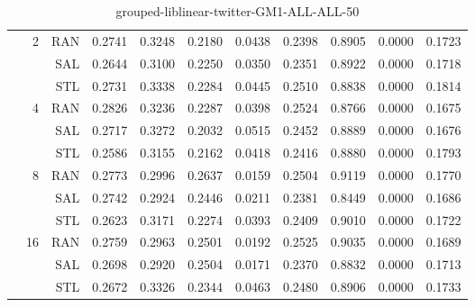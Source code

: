\begin{center}
\begin{table}[htbp]
\begin{tabular}{ | r | r | r | r | r | r | r | r | r | r | r |}
 & \multirow{3}{*}{2} & RAN & 0.2741 & 0.3248 & 0.2180 & 0.0438 & 0.2398 & 0.8905 & 0.0000 & 0.1723\\ \cline{3-11}
 &   & SAL & 0.2644 & 0.3100 & 0.2250 & 0.0350 & 0.2351 & 0.8922 & 0.0000 & 0.1718\\ \cline{3-11}
 &   & STL & 0.2731 & 0.3338 & 0.2284 & 0.0445 & 0.2510 & 0.8838 & 0.0000 & 0.1814\\ \cline{2-11}
 & \multirow{3}{*}{4} & RAN & 0.2826 & 0.3236 & 0.2287 & 0.0398 & 0.2524 & 0.8766 & 0.0000 & 0.1675\\ \cline{3-11}
 &   & SAL & 0.2717 & 0.3272 & 0.2032 & 0.0515 & 0.2452 & 0.8889 & 0.0000 & 0.1676\\ \cline{3-11}
 &   & STL & 0.2586 & 0.3155 & 0.2162 & 0.0418 & 0.2416 & 0.8880 & 0.0000 & 0.1793\\ \cline{2-11}
 & \multirow{3}{*}{8} & RAN & 0.2773 & 0.2996 & 0.2637 & 0.0159 & 0.2504 & 0.9119 & 0.0000 & 0.1770\\ \cline{3-11}
 &   & SAL & 0.2742 & 0.2924 & 0.2446 & 0.0211 & 0.2381 & 0.8449 & 0.0000 & 0.1686\\ \cline{3-11}
 &   & STL & 0.2623 & 0.3171 & 0.2274 & 0.0393 & 0.2409 & 0.9010 & 0.0000 & 0.1722\\ \cline{2-11}
 & \multirow{3}{*}{16} & RAN & 0.2759 & 0.2963 & 0.2501 & 0.0192 & 0.2525 & 0.9035 & 0.0000 & 0.1689\\ \cline{3-11}
 &   & SAL & 0.2698 & 0.2920 & 0.2504 & 0.0171 & 0.2370 & 0.8832 & 0.0000 & 0.1713\\ \cline{3-11}
 &   & STL & 0.2672 & 0.3326 & 0.2344 & 0.0463 & 0.2480 & 0.8906 & 0.0000 & 0.1733\\ \cline{2-11}
\hline
\end{tabular}
\caption{grouped-liblinear-twitter-GM1-ALL-ALL-50}
\end{table}
\end{center}

